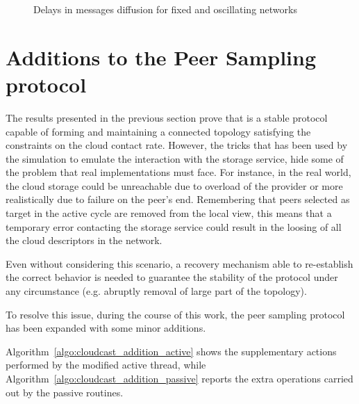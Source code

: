 \begin{figure}[H]
  \centering
  \caption{Delays in messages diffusion for fixed and oscillating networks}
  \label{fig:cloudcast-sim-globa-delay}
\end{figure}

\section{Additions to the Peer Sampling protocol}
\label{sec:cloudcast-additions}
The results presented in the previous section prove that
\cloudcast is a stable protocol capable of forming and maintaining a
connected topology satisfying the constraints on the cloud contact
rate. However,
the tricks that has been used by the simulation to emulate the interaction
with the storage service, hide some of the problem that real
implementations must face. For instance, in the real world, the
cloud storage could be unreachable due to overload of the provider
or more realistically due to failure on the peer's end. Remembering
that peers selected as target in the active cycle are removed from the
local view, this means that a temporary error contacting the
storage service could result in the loosing of all the
cloud descriptors in the network.

Even without considering this scenario, a recovery mechanism able to
re-establish the correct behavior is needed to guarantee the stability
of the protocol under any circumstance (e.g. abruptly removal of large
part of the topology).

To resolve this issue, during the course of this work, the
peer sampling protocol has been expanded with some minor additions.



Algorithm~\ref{algo:cloudcast_addition_active} shows the
supplementary actions performed by the modified \cyclon active thread,
while Algorithm~\ref{algo:cloudcast_addition_passive} reports
the extra operations carried out by the passive routines.

